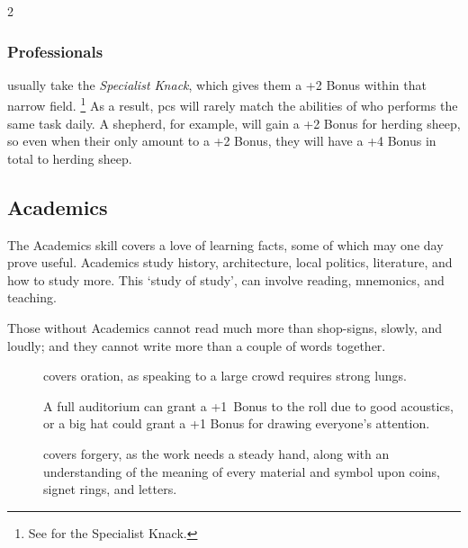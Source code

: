 \begin{multicols}{2}
\subsubsection{Professionals}
usually take the \textit{Specialist Knack}, which gives them a +2 Bonus within that narrow field.%
\footnote{See  for the Specialist Knack.}
As a result, \glspl{pc} will rarely match the abilities of  who performs the same task daily.
A shepherd, for example, will gain a +2 Bonus for herding sheep, so even when their  only amount to a +2 Bonus, they will have a +4 Bonus in total to herding sheep.

\subsection{Academics}
The Academics \gls{skill} covers a love of learning facts, some of which may one day prove useful.
%
Academics study history, architecture, local politics, literature, and how to study more.
This `study of study', can involve reading, mnemonics, and teaching.

Those without Academics cannot read much more than shop-signs, slowly, and loudly; and they cannot write more than a couple of words together.

\null

\begin{description}
  \item[]
    covers oration, as speaking to a large crowd requires strong lungs.

    A full auditorium can grant a +1~Bonus to the roll due to good acoustics, or a big hat could grant a +1 Bonus for drawing everyone's attention.
  \item[]
    covers forgery, as the work needs a steady hand, along with an understanding of the meaning of every material and symbol upon coins, signet rings, and letters.


\end{description}
\end{multicols}
